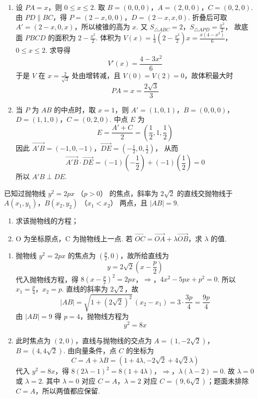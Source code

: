 \begin{solution}
\begin{enumerate}
\item 设 \(PA=x\)，则 \(0\le x\le2\). 取
\(B=(0,0,0)\)，\(A=(2,0,0)\)，\(C=(0,2,0)\).
由 \(PD\parallel BC\)，得 \(P=(2-x,0,0)\)，\(D=(2-x,x,0)\). 折叠后可取 \(A'=(2-x,0,x)\)，所以棱锥的高为 \(x\). 又
\(S_{\triangle ABC}=2\)，\(S_{\triangle APD}=\frac{x^2}{2}\)，
故底面 \(PBCD\) 的面积为 \(2-\frac{x^2}{2}\). 体积为
\(V(x)=\frac13\left(2-\frac{x^2}{2}\right)x =\frac{x(4-x^2)}6\)，\(0\le x\le2\).
求导得
\[
V'(x)=\frac{4-3x^2}{6}
\]
于是 \(V\) 在 \(x=\frac2{\sqrt3}\) 处由增转减，且 \(V(0)=V(2)=0\)，故体积最大时
\[
PA=x=\frac{2\sqrt3}{3}
\]
\item 当 \(P\) 为 \(AB\) 的中点时，取 \(x=1\)，则
\(A'=(1,0,1)\)，\(B=(0,0,0)\)，\(D=(1,1,0)\)，\(C=(0,2,0)\).
中点 \(E\) 为
\[
E=\frac{A'+C}{2}=\left(\frac12,1,\frac12\right)
\]
因此
\(\overrightarrow{A'B}=(-1,0,-1)\)，\(\overrightarrow{DE}=\left(-\frac12,0,\frac12\right)\)，
从而
\[
\overrightarrow{A'B}\cdot\overrightarrow{DE}
=(-1)\left(-\frac12\right)+(-1)\left(\frac12\right)=0
\]
所以 \(A'B\perp DE\).
\end{enumerate}
\end{solution}

\begin{problem}
已知过抛物线 \( y^{2} = 2px \) （\( p > 0 \)） 的焦点，斜率为 \( 2\sqrt{2} \) 的直线交抛物线于 \( A(x_{1}, y_{1}) \)，\( B(x_{2}, y_{2}) \) （\( x_{1} < x_{2} \)） 两点，且 \( |AB| = 9 \).
\begin{enumerate}
\item 求该抛物线的方程；
\item O 为坐标原点，C 为抛物线上一点. 若 \( \overrightarrow{OC} = \overrightarrow{OA} + \lambda \overrightarrow{OB} \)，求 \( \lambda \) 的值.
\end{enumerate}
\end{problem}

\begin{solution}
\begin{enumerate}
\item 抛物线 \(y^2=2px\) 的焦点为 \((\frac p2,0)\)，故所给直线为
\[
y=2\sqrt2\left(x-\frac p2\right)
\]
代入抛物线方程，得
\(8\left(x-\frac p2\right)^2=2px\)，\(\Longrightarrow\)，\(4x^2-5px+p^2=0\).
所以
\(x_1=\frac p4\)，\(x_2=p\).
直线的斜率为 \(2\sqrt2\)，故
\[
|AB|=\sqrt{1+(2\sqrt2)^2}\,(x_2-x_1)
=3\cdot\frac{3p}{4}=\frac{9p}{4}
\]
由 \(|AB|=9\) 得 \(p=4\)，抛物线方程为
\[
y^2=8x
\]
\item 此时焦点为 \((2,0)\)，直线与抛物线的交点为
\(A=(1,-2\sqrt2)\)，\(B=(4,4\sqrt2)\).
由向量条件，点 \(C\) 的坐标为
\[
C=A+\lambda B=(1+4\lambda,-2\sqrt2+4\sqrt2\lambda)
\]
代入 \(y^2=8x\)，得
\(8(2\lambda-1)^2=8(1+4\lambda)\)，\(\Longrightarrow\)，\(\lambda(\lambda-2)=0\).
故 \(\lambda=0\) 或 \(\lambda=2\). 其中 \(\lambda=0\) 对应 \(C=A\)，\(\lambda=2\) 对应 \(C=(9,6\sqrt2)\)；题面未排除 \(C=A\)，所以两值都应保留.
\end{enumerate}
\end{solution}

